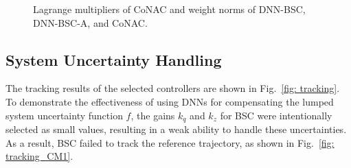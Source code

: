 \documentclass[lettersize,journal]{IEEEtran}
\begin{document}
\begin{figure}[!t]
    \centering
    \hfill
    \vfill
    \hfill
    \caption{Lagrange multipliers of CoNAC and weight norms of DNN-BSC, DNN-BSC-A, and CoNAC.}
    \label{fig: weight and multiplier}
\end{figure}

\subsection{System Uncertainty Handling}

The tracking results of the selected controllers are shown in Fig.~\ref{fig: tracking}.
To demonstrate the effectiveness of using DNNs for compensating the lumped system uncertainty function $f$, the gains ${k_q}$ and ${k_z}$ for BSC were intentionally selected as small values, resulting in a weak ability to handle these uncertainties. As a result,
BSC failed to track the reference trajectory, as shown in Fig.~\ref{fig: tracking_CM1}.
\end{document}
